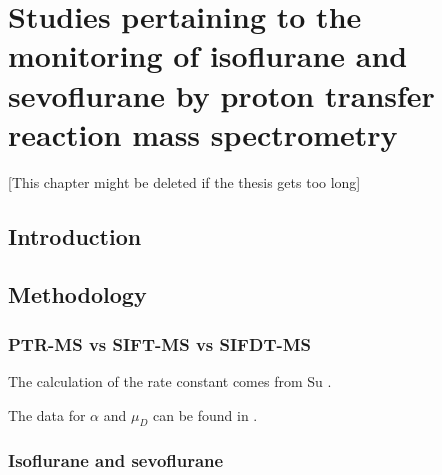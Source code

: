 

\chapter{Studies pertaining to the monitoring of isoflurane and sevoflurane by proton transfer reaction mass spectrometry}\label{chapter:iso}


[This chapter might be deleted if the thesis gets too long]


\section{Introduction}
\section{Methodology}
\subsection{PTR-MS vs SIFT-MS vs SIFDT-MS}






The calculation of the rate constant comes from Su \cite{su1994parametrization}.

The data for $\alpha$ and $\mu_D$ can be found in \cite{lide2012crc}.







\subsection{Isoflurane and sevoflurane}

